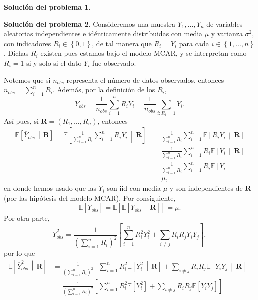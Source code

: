 \documentclass[twoside,12pt]{article}
\theoremstyle{definition}
\newtheorem{soln}{Solución del problema}
\newcommand{\expectation}[1]{\mathbb{E}\left[#1\right]}
\newcommand{\given}{\,\middle|\,}
\begin{document}
\newpage
\begin{soln}

\end{soln}

\newpage
\begin{soln}
Consideremos una muestra $Y_1, \ldots, Y_n$ de variables aleatorias independientes e idénticamente distribuidas con media $\mu$ y varianza $\sigma^2$, con indicadores $R_i \in \left\lbrace 0, 1 \right\rbrace$, de tal manera que $R_i\perp Y_i$ para cada $i\in \left\lbrace 1, \ldots, n \right\rbrace$. Dichas $R_i$ existen pues estamos bajo el modelo MCAR, y se interpretan como $R_i = 1$ si y solo si el dato $Y_i$ fue observado.

Notemos que si $n_{obs}$ representa el número de datos observados, entonces $n_{obs} = \sum_{i=1}^{n} R_i$. Además, por la definición de los $R_i$,
\[
\overline{Y}_{obs} = \frac{1}{n_{obs}} \sum_{i=1}^{n} R_i Y_i = \frac{1}{n_{obs}} \sum_{i: R_i=1} Y_i.
\]
Así pues, si $\boldsymbol{R}=(R_1, \ldots, R_n)$, entonces
\[
\begin{split}
  \expectation{\overline{Y}_{obs} \given \boldsymbol{R}} = \expectation{\frac{1}{\sum_{i=1}^{n} R_i} \sum_{i=1}^{n} R_i Y_i  \given \boldsymbol{R}} &= \frac{1}{\sum_{i=1}^{n} R_i} \sum_{i=1}^{n} \expectation{R_i Y_i \given \boldsymbol{R}}\\
  &= \frac{1}{\sum_{i=1}^{n} R_i} \sum_{i=1}^{n} R_i\expectation{Y_i \given \boldsymbol{R}}\\
  &= \frac{1}{\sum_{i=1}^{n} R_i} \sum_{i=1}^{n} R_i\expectation{Y_i}\\
  &=\mu,
\end{split}
\]
en donde hemos usado que las $Y_i$ son iid con media $\mu$ y son independientes de $\boldsymbol{R}$ (por las hipótesis del modelo MCAR). Por consiguiente,
\[
\expectation{\overline{Y}_{obs}} = \expectation{\expectation{\overline{Y}_{obs} \given \boldsymbol{R}}} = \mu.
\]
Por otra parte,
\[
\overline{Y}_{obs}^2 = \frac{1}{{\left(\sum_{i=1}^{n} R_i\right)}^2} \left[\sum_{i=1}^{n}R_i^2 Y_i^2 + \sum_{i\neq j}R_i R_j Y_i Y_j\right],
\]
por lo que
\[
\begin{split}
  \expectation{\overline{Y}_{obs}^2 \given \boldsymbol{R}} &= \frac{1}{{\left(\sum_{i=1}^{n} R_i\right)}^2} \left[\sum_{i=1}^{n} R_i^2 \expectation{Y_i^2 \given \boldsymbol{R}} + \sum_{i\neq j}R_i R_j \expectation{Y_i Y_j \given \boldsymbol{R}}\right]\\
  &= \frac{1}{{\left(\sum_{i=1}^{n} R_i\right)}^2} \left[\sum_{i=1}^{n} R_i^2 \expectation{Y_i^2} + \sum_{i\neq j}R_i R_j \expectation{Y_i Y_j}\right]\\

\end{split}\]
\end{soln}
\end{document}
